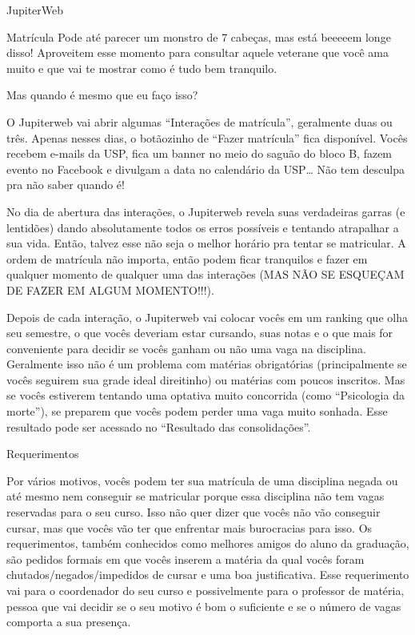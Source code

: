 \begin{secao}{JupiterWeb}
\begin{subsecao}{Matrícula}
Pode até parecer um monstro de 7 cabeças, mas está beeeeem longe disso!
Aproveitem esse momento para consultar aquele veterane que você ama muito e que
vai te mostrar como é tudo bem tranquilo.

Mas quando é mesmo que eu faço isso?

O Jupiterweb vai abrir algumas “Interações de matrícula”, geralmente duas ou três.
Apenas nesses dias, o botãozinho de “Fazer matrícula” fica disponível. Vocês
recebem e-mails da USP, fica um banner no meio do saguão do bloco B, fazem
evento no Facebook e divulgam a data no calendário da USP… Não tem desculpa pra
não saber quando é!

No dia de abertura das interações, o Jupiterweb revela suas verdadeiras garras
(e lentidões) dando absolutamente todos os erros possíveis e tentando
atrapalhar a sua vida. Então, talvez esse não seja o melhor horário pra tentar
se matricular. A ordem de matrícula não importa, então podem ficar tranquilos e
fazer em qualquer momento de qualquer uma das interações (MAS NÃO SE ESQUEÇAM DE
FAZER EM ALGUM MOMENTO!!!).

Depois de cada interação, o Jupiterweb vai colocar vocês em um ranking que olha seu
semestre, o que vocês deveriam estar cursando, suas notas e o que mais for
conveniente para decidir se vocês ganham ou não uma vaga na disciplina.
Geralmente isso não é um problema com matérias obrigatórias (principalmente se
vocês seguirem sua grade ideal direitinho) ou matérias com poucos inscritos. Mas
se vocês estiverem tentando uma optativa muito concorrida (como ``Psicologia da
morte''), se preparem que vocês podem perder uma vaga muito sonhada.
Esse resultado pode ser acessado no ``Resultado das consolidações''.

\end{subsecao}
\begin{subsecao}{Requerimentos}

Por vários motivos, vocês podem ter sua matrícula de uma disciplina negada ou
até mesmo nem conseguir se matricular porque essa disciplina não tem vagas
reservadas para o seu curso. Isso não quer dizer que vocês não vão conseguir
cursar, mas que vocês vão ter que enfrentar mais burocracias para isso. Os
requerimentos, também conhecidos como melhores amigos do aluno da graduação,
são pedidos formais em que vocês inserem a matéria da qual vocês foram
chutados/negados/impedidos de cursar e uma boa justificativa. Esse requerimento
vai para o coordenador do seu curso e possivelmente para o professor de
matéria, pessoa que vai decidir se o seu motivo é bom o suficiente e se o
número de vagas comporta a sua presença.


\end{subsecao}
\end{secao}

